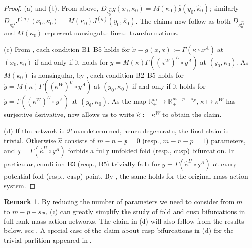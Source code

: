 \documentclass[11pt]{amsart}
\renewcommand{\k}{\kappa}
\newcommand{\R}{\mathbb{R}}
\newcommand{\wG}{\widehat{G}}
\newcommand{\mP}{\mathcal{P}}
\theoremstyle{definition}
\newtheorem{remark}[theorem]{Remark}
\begin{document}
\begin{proof}
(a) and (b). From above, $D_{\k_0^{\wG}} g(x_0, \k_0) = M(\k_0)\hat{g}(y_0, \hat{\k}_0)$; similarly $D_{\k_0^{\wG}} J^{(g)}(x_0, \k_0) = M(\k_0)J^{(\hat{g})}(y_0, \hat{\k}_0)$. The claims now follow as both $D_{\k_0^{\wG}}$ and $M(\k_0)$ represent nonsingular linear transformations. 


(c) From , each condition B1--B5 holds for $\dot x = g(x,\k):= \Gamma(\k\circ x^A)$ at $(x_0, \k_0)$ if and only if it holds for $\dot y = M(\kappa) \Gamma((\k^W)^U\circ y^A)$ at $(y_0, \k_0)$. As $M(\k_0)$ is nonsingular, by , each condition B2--B5 holds for $\dot y = M(\kappa) \Gamma((\k^W)^U\circ y^A)$ at $(y_0, \k_0)$ if and only if it holds for $\dot y = \Gamma((\k^W)^U\circ y^A)$ at $(y_0, \k_0)$. As the map $\R^m_+ \to \R^{m-p-s_{\mP}}_+$, $\k \mapsto \k^W$ has surjective derivative,  now allows us to write $\hat{\k}:= \k^W$ to obtain the claim. 

(d) If the network is $\mP$-overdetermined, hence degenerate, the final claim is trivial. Otherwise $\hat{\k}$ consists of $m-n-p = 0$ (resp., $m-n-p = 1$) parameters, and $\dot y = \Gamma(\hat{\k}^U\circ y^A)$ forbids a fully unfolded fold (resp., cusp) bifurcation. In particular, condition B3 (resp., B5) trivially fails for $\dot y = \Gamma(\hat{\k}^U\circ y^A)$ at every potential fold (resp., cusp) point. By , the same holds for the original mass action system. 
\end{proof}

\begin{remark}
By reducing the number of parameters we need to consider from $m$ to $m-p-s_{\mP}$, (c) can greatly simplify the study of fold and cusp bifurcations in full-rank mass action networks. The claim in (d) will also follow from the results below, see . A special case of the claim about cusp bifurcations in (d) for the trivial partition appeared in \cite[Theorem 36]{BBH2024smallbif}.
\end{remark}
\end{document}
